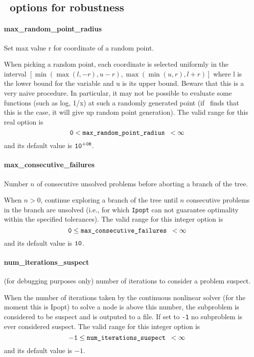 \subsection{\Bonmin\ options for robustness}

\paragraph{max\_random\_point\_radius}
Set max value r for coordinate of a random point.

 When picking a random point, each coordinate is selected uniformly
in the interval $[\min(\max(l,-r),u-r),
\max(\min(u,r),l+r)]$ where l is the lower bound
for the variable and u is its upper bound.
Beware that this is a very naive procedure. In particular,
it may not be possible to evaluate some functions (such as log, 1/x)
at such a randomly generated point (if \Bonmin\  finds that this is the case,
it will give up random point generation).
The valid range for this real option is
$${\tt 0} <  \hbox{\tt max\_random\_point\_radius } <  \infty$$
and its default value is ${\tt 10^{+08}}$.


\paragraph{max\_consecutive\_failures}
Number $n$ of consecutive unsolved problems before aborting
a branch of the tree.

 When $n > 0$, continue exploring a branch of the
tree until $n$ consecutive problems in the branch
are unsolved (i.e., for
which {\tt Ipopt} can not guarantee optimality within
the specified tolerances). The valid range for this integer option is
$${\tt 0} \le \hbox{\tt max\_consecutive\_failures } <  \infty$$
and its default value is ${\tt 10}$.


\paragraph{num\_iterations\_suspect}
(for debugging purposes only) number of iterations to consider a problem
suspect.

When the number of iterations taken by the continuous nonlinear solver
(for the moment this is Ipopt) to solve a node is above this number,
the subproblem is
considered to be suspect and is outputed
to a file. If set to {\tt -1} no subproblem is ever considered suspect.
The valid range for this integer option is
$${\tt -1} \le \hbox{\tt num\_iterations\_suspect } <  \infty$$
and its default value is $-1$.


